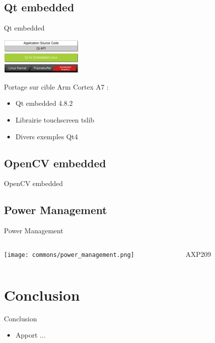 \documentclass[11pt]{beamer}
\begin{document}
	\subsection{Qt embedded}
	\begin{frame}{Qt embedded}
		\begin{center}
			  \includegraphics[width=4cm]{commons/qt-embedded-linux-architecture.png}
		\end{center}
			  Portage sur cible Arm Cortex A7 : 
		\begin{itemize}
			  \item<+-|alert@+> Qt embedded 4.8.2
			  \item<+-|alert@+> Librairie touchscreen tslib
			  \item<+-|alert@+> Divers exemples Qt4
		\end{itemize}
	\end{frame}
	
	\subsection{OpenCV embedded}
	\begin{frame}{OpenCV embedded}
		\begin{center}
			
		\end{center}
	\end{frame}
	
	\subsection{Power Management}
	\begin{frame}{Power Management}
		\begin{columns}[t]
		\begin{column}{5cm}
		\texttt{[image: commons/power\_management.png]}
		\end{column}
		\begin{column}{5cm}
		AXP209
		\end{column}
		\end{columns}
		
	\end{frame}
	
	\section{Conclusion}
	\begin{frame}{Conclusion}
		\begin{center}
		\begin{itemize}
			\item Apport ...
		\end{itemize}
		\end{center}
	\end{frame}
\end{document}
